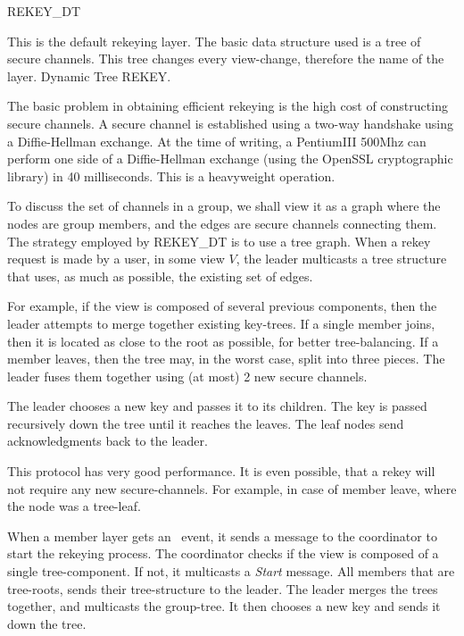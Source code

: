%
%
%
\begin{Layer}{REKEY\_DT}
\label{layer:rekey_dt}

This is the default rekeying layer. The basic 
data structure used is a tree of secure channels. This tree
changes every view-change, therefore the name of the layer. 
Dynamic Tree REKEY. 

The basic problem in obtaining efficient rekeying is the high cost of
constructing secure channels. A secure channel is established using a
two-way handshake using a Diffie-Hellman exchange.  At the time of
writing, a PentiumIII 500Mhz can perform one side of a Diffie-Hellman
exchange (using the OpenSSL cryptographic library) in 40 milliseconds.
This is a heavyweight operation. 

To discuss the set of channels in a group, we shall view it as a graph
where the nodes are group members, and the edges are secure channels
connecting them. The strategy employed by REKEY\_DT is to use a tree
graph. When a rekey request is made by a user, in some view $V$, the
leader multicasts a tree structure that uses, as much as possible, the
existing set of edges. 

For example, if the view is composed of several previous
components, then the leader attempts to merge together existing
key-trees. If a single member joins, then it is located as close to the
root as possible, for better tree-balancing. If a member leaves, then
the tree may, in the worst case, split into three pieces. The leader
fuses them together using (at most) 2 new secure channels. 

The leader chooses a new key and passes it to its
children. The key is passed recursively down the tree until it reaches
the leaves. The leaf nodes send acknowledgments back to the leader.

This protocol has very good performance. It is even possible, that a
rekey will not require any new secure-channels. For example, in case
of member leave, where the node was a tree-leaf. 

\begin{Protocol}
When a member layer gets an \ERekeyPrcl\ event, it sends a message to the
coordinator to start the rekeying process.  The coordinator checks if
the view is composed of a single tree-component. If not, it multicasts
a {\it Start} message. All members that are tree-roots, sends their
tree-structure to the leader. The leader merges the trees together,
and multicasts the group-tree. It then chooses a new key and sends it
down the tree. 


\end{Protocol}
\end{Layer}

